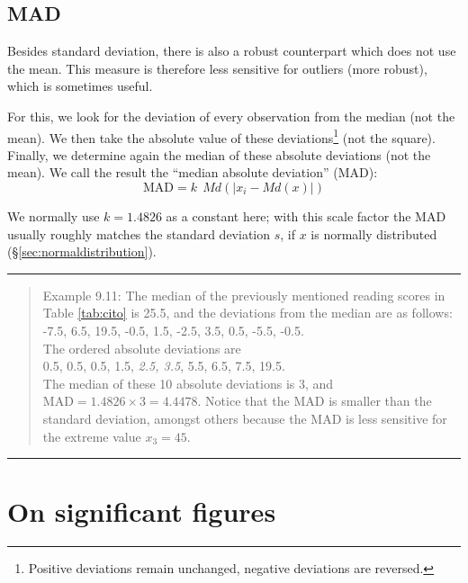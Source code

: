 \documentclass[
]{book}
\begin{document}
\hypertarget{mad}{%
\subsection{MAD}\label{mad}}

Besides standard deviation, there is also a robust counterpart
which does not use the mean. This measure is therefore less
sensitive for outliers (more robust), which is sometimes useful.

For this, we look for the deviation of every observation from
the median (not the mean). We then take the absolute value
of these deviations\footnote{Positive deviations remain unchanged, negative deviations are reversed.} (not the square). Finally, we
determine again the median of these absolute deviations (not the mean).
We call the result the ``median absolute deviation'' (MAD):
\begin{equation}
  \textrm{MAD} = k ~~ Md ( |x_i - Md(x) |)
  \label{eq:MAD}
\end{equation}

We normally use \(k=1.4826\) as a constant here; with this scale factor the MAD
usually roughly matches the standard deviation \(s\), if \(x\) is
normally distributed (§\ref{sec:normaldistribution}).

\begin{center}\rule{0.5\linewidth}{0.5pt}\end{center}

\begin{quote}
Example 9.11:
The median of the previously mentioned reading scores in
Table \ref{tab:cito} is
25.5, and the deviations from the median are as follows:\\
-7.5, 6.5, 19.5, -0.5, 1.5, -2.5, 3.5, 0.5, -5.5, -0.5.\\
The ordered absolute deviations are\\
0.5, 0.5, 0.5, 1.5, \emph{2.5, 3.5}, 5.5, 6.5, 7.5, 19.5.\\
The median of these 10 absolute deviations is 3, and
\(\textrm{MAD} = 1.4826 \times 3 = 4.4478\). Notice that the MAD
is smaller than the standard deviation, amongst others because the MAD is less sensitive
for the extreme value \(x_3=45\).
\end{quote}

\begin{center}\rule{0.5\linewidth}{0.5pt}\end{center}

\hypertarget{sec:significantfigures}{%
\section{On significant figures}\label{sec:significantfigures}}
\end{document}
